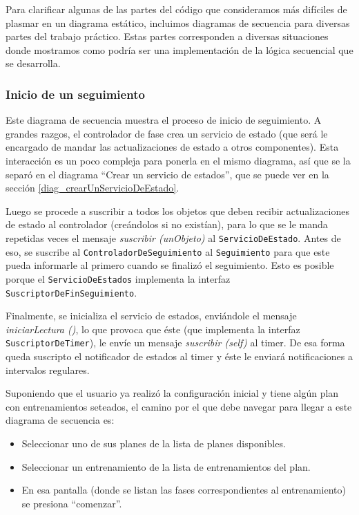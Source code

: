 
Para clarificar algunas de las partes del código que consideramos más difíciles de plasmar en un diagrama estático, incluimos diagramas de secuencia para diversas partes del trabajo práctico. Estas partes corresponden a diversas situaciones donde mostramos como podría ser una implementación de la lógica secuencial que se desarrolla.

\subsubsection{Inicio de un seguimiento}\label{diag_inicioSeguimiento}

Este diagrama de secuencia muestra el proceso de inicio de seguimiento. A grandes razgos, el controlador de fase crea un servicio de estado (que será le encargado de mandar las actualizaciones de estado a otros componentes). Esta interacción es un poco compleja para ponerla en el mismo diagrama, así que se la separó en el diagrama ``Crear un servicio de estados'', que se puede ver en la sección \ref{diag_crearUnServicioDeEstado}. 


Luego se procede a suscribir a todos los objetos que deben recibir actualizaciones de estado al controlador (creándolos si no existían), para lo que se le manda repetidas veces el mensaje \emph{suscribir (unObjeto)} al \texttt{ServicioDeEstado}. Antes de eso, se suscribe al \texttt{ControladorDeSeguimiento} al \texttt{Seguimiento} para que este pueda informarle al primero cuando se finalizó el seguimiento. Esto es posible porque el \texttt{ServicioDeEstados} implementa la interfaz \texttt{SuscriptorDeFinSeguimiento}.


Finalmente, se inicializa el servicio de estados, enviándole el mensaje \emph{iniciarLectura ()}, lo que provoca que éste (que implementa la interfaz \texttt{SuscriptorDeTimer}), le envíe un mensaje \emph{suscribir (self)} al timer. De esa forma queda suscripto el notificador de estados al timer y éste le enviará notificaciones a intervalos regulares.


Suponiendo que el usuario ya realizó la configuración inicial y tiene algún plan con entrenamientos seteados, el camino por el que debe navegar para llegar a este diagrama de secuencia es:
\begin{itemize}
	\item Seleccionar uno de sus planes de la lista de planes disponibles.
	\item Seleccionar un entrenamiento de la lista de entrenamientos del plan.
	\item En esa pantalla (donde se listan las fases correspondientes al entrenamiento) se presiona ``comenzar''.
\end{itemize}

